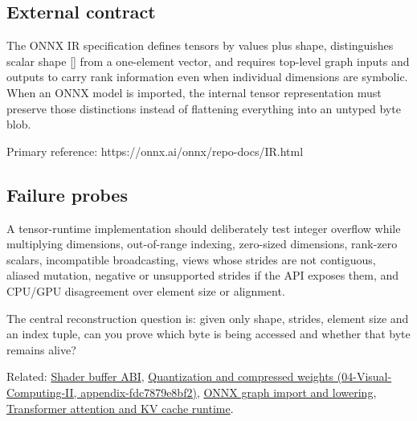 \subsection{External contract}\label{appendix-cebadf3106d1-external-contract}

The ONNX IR specification defines tensors by values plus shape, distinguishes scalar shape {[}{]} from a one-element vector, and requires top-level graph inputs and outputs to carry rank information even when individual dimensions are symbolic. When an ONNX model is imported, the internal tensor representation must preserve those distinctions instead of flattening everything into an untyped byte blob.

Primary reference: https://onnx.ai/onnx/repo-docs/IR.html

\subsection{Failure probes}\label{appendix-cebadf3106d1-failure-probes}

A tensor-runtime implementation should deliberately test integer overflow while multiplying dimensions, out-of-range indexing, zero-sized dimensions, rank-zero scalars, incompatible broadcasting, views whose strides are not contiguous, aliased mutation, negative or unsupported strides if the API exposes them, and CPU/GPU disagreement over element size or alignment.

The central reconstruction question is: given only shape, strides, element size and an index tuple, can you prove which byte is being accessed and whether that byte remains alive?

Related: \hyperref[appendix-749048795dbb]{Shader buffer ABI}, \href{../04-Visual-Computing-II/main.pdf\#nameddest=appendix-fdc7879e8bf2}{Quantization and compressed weights (04-Visual-Computing-II, appendix-fdc7879e8bf2)}, \hyperref[appendix-a87217e3af2b]{ONNX graph import and lowering}, \hyperref[appendix-ea2dadd21ce5]{Transformer attention and KV cache runtime}.
